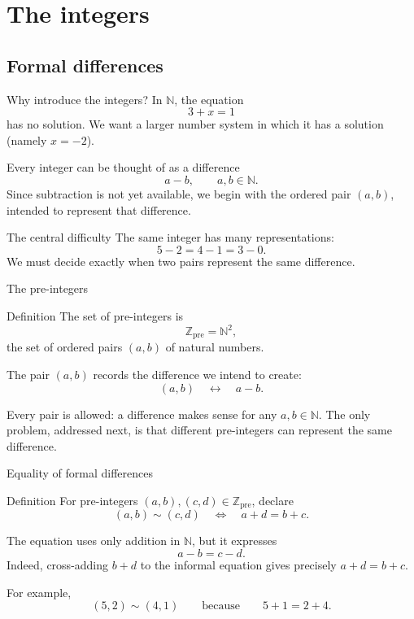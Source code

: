 \documentclass[aspectratio=169,11pt]{beamer}
\newcommand{\N}{\mathbb N}
\newcommand{\Z}{\mathbb Z}
\begin{document}
\section{The integers}

\subsection{Formal differences}

\begin{frame}{Why introduce the integers?}
  In \(\N\), the equation
  \[
    3+x=1
  \]
  has no solution.  We want a larger number system in which it has a solution
  (namely \(x=-2\)).

  Every integer can be thought of as a difference
  \[
    a-b,\qquad a,b\in\N.
  \]
  Since subtraction is not yet available, we begin with the ordered pair
  \((a,b)\), intended to represent that difference.

  \begin{alertblock}{The central difficulty}
    The same integer has many representations:
    \[
      5-2=4-1=3-0.
    \]
    We must decide exactly when two pairs represent the same difference.
  \end{alertblock}
\end{frame}

\begin{frame}{The pre-integers}
  \begin{block}{Definition}
    The set of \alert{pre-integers} is
    \[
      \Z_{\mathrm{pre}}=\N^2,
    \]
    the set of ordered pairs \((a,b)\) of natural numbers.
  \end{block}

  The pair \((a,b)\) records the difference we intend to create:
  \[
    (a,b)\quad\longleftrightarrow\quad a-b.
  \]

  Every pair is allowed: a difference makes sense for any \(a,b\in\N\).
  The only problem, addressed next, is that different pre-integers can
  represent the same difference.
\end{frame}

\begin{frame}{Equality of formal differences}
  \begin{block}{Definition}
    For pre-integers \((a,b),(c,d)\in\Z_{\mathrm{pre}}\), declare
    \[
      (a,b)\sim(c,d)
      \quad\Longleftrightarrow\quad
      a+d=b+c.
    \]
  \end{block}

  The equation uses only addition in \(\N\), but it expresses
  \[
    a-b=c-d.
  \]
  Indeed, cross-adding \(b+d\) to the informal equation gives precisely
  \(a+d=b+c\).

  For example,
  \[
    (5,2)\sim(4,1)
    \qquad\text{because}\qquad
    5+1=2+4.
  \]
\end{frame}
\end{document}
